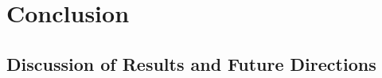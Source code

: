 \chapter{Conclusion}
\label{chap:conclusion}

\section{Discussion of Results and Future Directions}
